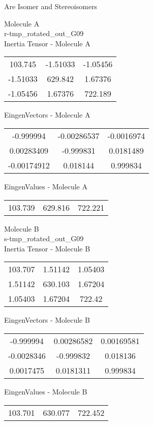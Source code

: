 \begin{center}
\vtab
\vtab
\textcolor{NavyBlue}{\Large Are Isomer and Stereoisomers}
\end{center}
\newpage
\begin{multicols}{2}
\begin{center}
Molecule A \\ 
r-tmp\_rotated\_out\_G09
\\
Inertia Tensor - Molecule A \\
\vtab
\begin{tabular}{|c c c|}
103.745	 & 	-1.51033	 & 	-1.05456	 \\
-1.51033	 & 	629.842	 & 	1.67376	 \\
-1.05456	 & 	1.67376	 & 	722.189
\end{tabular}

\vtab
 EingenVectors - Molecule A     \\
\vtab
\begin{tabular}{|c c c|}
-0.999994	 & 	-0.00286537	 & 	-0.0016974	 \\
0.00283409	 & 	-0.999831	 & 	0.0181489	 \\
-0.00174912	 & 	0.018144	 & 	0.999834
\end{tabular}

\vtab
 EingenValues - Molecule A     \\
\vtab
\begin{tabular}{|c c c|}
103.739	 & 	629.816	 & 	722.221
\end{tabular}
\columnbreak

Molecule B \\ 
s-tmp\_rotated\_out\_G09
\\
Inertia Tensor - Molecule B \\
\vtab
\begin{tabular}{|c c c|}
103.707	 & 	1.51142	 & 	1.05403	 \\
1.51142	 & 	630.103	 & 	1.67204	 \\
1.05403	 & 	1.67204	 & 	722.42
\end{tabular}

\vtab
 EingenVectors - Molecule B     \\
\vtab
\begin{tabular}{|c c c|}
-0.999994	 & 	0.00286582	 & 	0.00169581	 \\
-0.0028346	 & 	-0.999832	 & 	0.018136	 \\
0.0017475	 & 	0.0181311	 & 	0.999834
\end{tabular}

\vtab
 EingenValues - Molecule B     \\
\vtab
\begin{tabular}{|c c c|}
103.701	 & 	630.077	 & 	722.452
\end{tabular}

\end{center}
\end{multicols}
